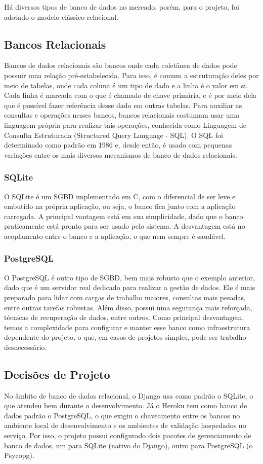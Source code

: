 Há diversos tipos de banco de dados no mercado, porém, para o projeto, foi adotado o modelo clássico relacional.

\subsection{Bancos Relacionais}
Bancos de dados relacionais são bancos onde cada coletânea de dados pode possuir uma relação pré-estabelecida. Para isso, é comum a estruturação deles por meio de tabelas, onde cada coluna é um tipo de dado e a linha é o valor em si. Cada linha é marcada com o que é chamado de chave primária, e é por meio dela que é possível fazer referência desse dado em outras tabelas. Para auxiliar as consultas e operações nesses bancos, bancos relacionais costumam usar uma linguagem própria para realizar tais operações, conhecida como Linguagem de Consulta Estruturada (Structured Query Language - SQL). O SQL foi determinado como padrão em 1986 e, desde então, é usado com pequenas variações entre os mais diversos mecanismos de banco de dados relacionais\cite{amazonwebservices2018}.

\subsubsection{SQLite}
O SQLite é um SGBD implementado em C, com o diferencial de ser leve e embutido na própria aplicação, ou seja, o banco fica junto com a aplicação carregada. A principal vantagem está em sua simplicidade, dado que o banco praticamente está pronto para ser usado pelo sistema. A desvantagem está no acoplamento entre o banco e a aplicação, o que nem sempre é saudável\cite{devmedia2007}.

\subsubsection{PostgreSQL}
O PostgreSQL é outro tipo de SGBD, bem mais robusto que o exemplo anterior, dado que é um servidor real dedicado para realizar a gestão de dados. Ele é mais preparado para lidar com cargas de trabalho maiores, consultas mais pesadas, entre outras tarefas robustas. Além disso, possui uma segurança mais reforçada, técnicas de recuperação de dados, entre outros. Como principal desvantagem, temos a complexidade para configurar e manter esse banco como infraestrutura dependente do projeto, o que, em casos de projetos simples, pode ser trabalho desnecessário\cite{devmedia2015}.

\subsection{Decisões de Projeto}
No âmbito de banco de dados relacional, o Django usa como padrão o SQLite, o que atendeu bem durante o desenvolvimento. Já o Heroku tem como banco de dados padrão o PostgreSQL, o que exigiu o chaveamento entre os bancos no ambiente local de desenvolvimento e os ambientes de validação hospedados no serviço. Por isso, o projeto possui configurado dois pacotes de gerenciamento de banco de dados, um para SQLite (nativo do Django), outro para PostgreSQL (o Psycopg\cite{lucassouto2017}).

